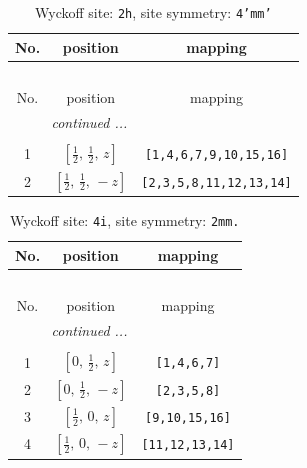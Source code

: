 \documentclass[fleqn,8pt]{jsarticle}
\begin{document}
\begin{longtable}{ccc}
\caption{Wyckoff site: {\tt 2h}, site symmetry: {\tt 4'mm'}}
 \\
 \hline \hline
No. & position & mapping \\ \hline \endfirsthead

\multicolumn{2}{l}{\tablename\ \thetable{}} \\
 \hline \hline
No. & position & mapping \\ \hline \endhead

 \hline \hline
\multicolumn{2}{r}{\footnotesize\it continued ...} \\ \endfoot

 \hline \hline
\multicolumn{2}{r}{} \\ \endlastfoot

1 & $\left[ \frac{1}{2},\, \frac{1}{2},\, z \right]$ & {\tt [1,4,6,7,9,10,15,16]} \\ \hline
2 & $\left[ \frac{1}{2},\, \frac{1}{2},\, - z \right]$ & {\tt [2,3,5,8,11,12,13,14]} \\
\end{longtable}
\renewcommand{\arraystretch}{1.2}
\begin{longtable}{ccc}
\caption{Wyckoff site: {\tt 4i}, site symmetry: {\tt 2mm.}}
 \\
 \hline \hline
No. & position & mapping \\ \hline \endfirsthead

\multicolumn{2}{l}{\tablename\ \thetable{}} \\
 \hline \hline
No. & position & mapping \\ \hline \endhead

 \hline \hline
\multicolumn{2}{r}{\footnotesize\it continued ...} \\ \endfoot

 \hline \hline
\multicolumn{2}{r}{} \\ \endlastfoot

1 & $\left[ 0,\, \frac{1}{2},\, z \right]$ & {\tt [1,4,6,7]} \\ \hline
2 & $\left[ 0,\, \frac{1}{2},\, - z \right]$ & {\tt [2,3,5,8]} \\ \hline
3 & $\left[ \frac{1}{2},\, 0,\, z \right]$ & {\tt [9,10,15,16]} \\ \hline
4 & $\left[ \frac{1}{2},\, 0,\, - z \right]$ & {\tt [11,12,13,14]} \\
\end{longtable}
\renewcommand{\arraystretch}{1.2}
\end{document}
